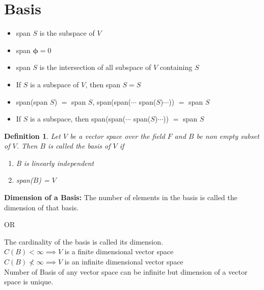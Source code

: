 \documentclass[a4paper, titlepage]{article}
\newtheorem{definition}{Definition}[section]
\begin{document}
\section{Basis}
    \begin{itemize}[label=$\implies$]
        \item span $S$ is the subspace of $V$
        \item span $\bm{\phi} = {0}$
        \item span $S$ is the intersection of all subspace of $V$ 
        containing $S$
        \item If $S$ is a subspace of $V$, then span $S = S$
        \item span(span $S$) $= $ span $S$, span(span($\cdots$ span($S$)$\cdots$)) $=$ span $S$
        \item If $S$ is a subspace, then span(span($\cdots$ span($S$)$\cdots$)) $=$ span $S$
    \end{itemize}
    \begin{definition}
        Let $V$ be a vector space over the field $F$ and $B$ be non 
        empty subset of $V$. Then $B$ is called the basis of $V$ if
        \begin{enumerate}[label=\textup{(\alph*)}]
            \item B is linearly independent
            \item \textup{span($B$)} = $V$
        \end{enumerate}
    \end{definition}
    \textbf{Dimension of a Basis: }The number of elements in the 
    basis is called the dimension of that basis.
    \begin{center}
        OR
    \end{center}
    The cardinality of the basis is called its dimension. \hfill \\
    $C(B) < \infty \implies V$ is a finite dimensional vector space \hfill \\
    $C(B) \nless \infty \implies V$ is an infinite dimensional vector space \hfill \\
    Number of Basis of any vector space can be infinite but dimension of a 
    vector space is unique.
\end{document}
